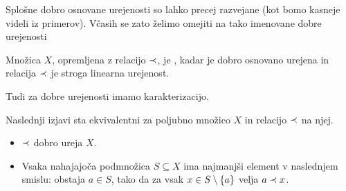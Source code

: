 \begin{dokaz}
\end{dokaz}

Splošne dobro osnovane urejenosti so lahko precej razvejane (kot bomo kasneje videli iz primerov). Včasih se zato želimo omejiti na tako imenovane dobre urejenosti

\begin{definicija}
        Množica $X$, opremljena z relacijo $\prec$, je , kadar je dobro osnovano urejena in relacija $\prec$ je stroga linearna urejenost.
\end{definicija}

Tudi za dobre urejenosti imamo karakterizacijo.

\begin{izrek}
        Naslednji izjavi sta ekvivalentni za poljubno množico $X$ in relacijo $\prec$ na njej.
        \begin{itemize}
                \item
                        $\prec$ dobro ureja $X$.
                \item
                        Vsaka nahajajoča podmnožica $S \subseteq X$ ima najmanjši element v naslednjem smislu: obstaja $a \in S$, tako da za vsak $x \in S \setminus \set{a}$ velja $a \prec x$.
        \end{itemize}
\end{izrek}

\begin{dokaz}
\end{dokaz}



